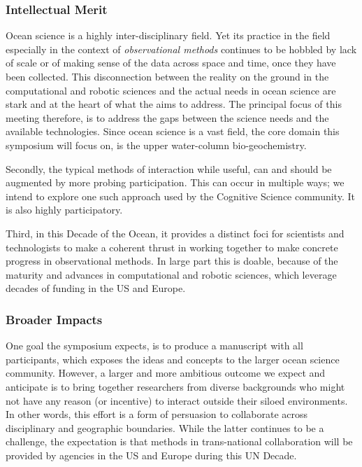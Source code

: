 

\subsubsection{Intellectual Merit}

Ocean science is a highly inter-disciplinary field. Yet its practice in
the field especially in the context of \emph{observational methods}
continues to be hobbled by lack of scale or of making sense of the data
across space and time, once they have been collected. This disconnection 
between the reality on the ground in the computational and robotic
sciences and the actual needs in ocean science are stark and at the
heart of what the \symp aims to address. The principal focus of this
meeting therefore, is to address the gaps between the science needs and
the available technologies. Since ocean science is a vast field, the
core domain this symposium will focus on, is the upper water-column
bio-geochemistry.

Secondly, the typical methods of interaction while useful, can and
should be augmented by more probing participation. This can occur in
multiple ways; we intend to explore one such approach used by the
Cognitive Science community. It is also highly participatory.

Third, in this Decade of the Ocean, it provides a distinct foci for
scientists and technologists to make a coherent thrust in working
together to make concrete progress in observational methods. In large
part this is doable, because of the maturity and advances in
computational and robotic sciences, which leverage decades of funding in
the US and Europe.

\subsubsection{Broader Impacts}

One goal the symposium expects, is to produce a manuscript with all
participants, which exposes the ideas and concepts to the larger ocean
science community. However, a larger and more ambitious outcome we
expect and anticipate is to bring together researchers from diverse
backgrounds who might not have any reason (or incentive) to interact
outside their siloed environments. In other words, this effort is a form
of persuasion to collaborate across disciplinary and geographic
boundaries. While the latter continues to be a challenge, the
expectation is that methods in trans-national collaboration will be
provided by agencies in the US and Europe during this UN Decade.

